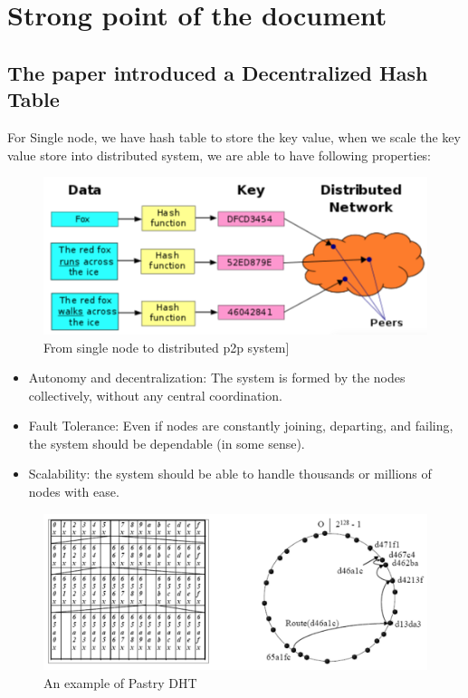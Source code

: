 \documentclass[acmlarge]{acmart}
\begin{document}
\keywords{}


\maketitle

\section{Strong point of the document}

\subsection{The paper introduced a Decentralized Hash Table}
For Single node, we have hash table to store the key value, when we scale the key value store into distributed system, we are able to have following properties:
\begin{figure}[htbp]
  \centering
  \includegraphics[width=0.6\columnwidth]{./distributed.png}
  \caption{From single node to distributed p2p system\cite{wikipedia}]}
\end{figure}
\begin{itemize}
  \item Autonomy and decentralization: The system is formed by the nodes collectively, without any central coordination.
  \item Fault Tolerance: Even if nodes are constantly joining, departing, and failing, the system should be dependable (in some sense).
  \item Scalability: the system should be able to handle thousands or millions of nodes with ease.
\end{itemize}
\begin{figure}[htbp]
  \centering
  \includegraphics[width=0.6\columnwidth]{./genral.png}
  \caption{An example of Pastry DHT \cite{radkepastry}}
\end{figure}
\end{document}
